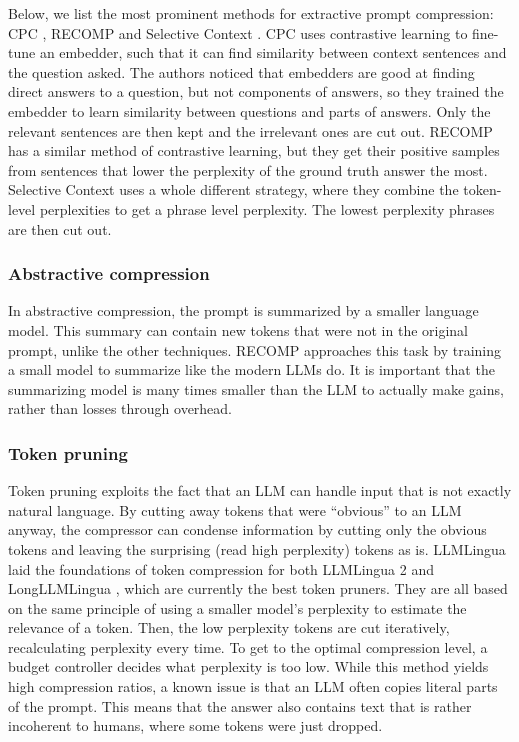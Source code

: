 Below, we list the most prominent methods for extractive prompt compression: CPC \cite{liskavets2025cpc}, RECOMP \cite{xu2023recomp} and Selective Context \cite{li2023selectivecontext}. CPC uses contrastive learning to fine-tune an embedder, such that it can find similarity between context sentences and the question asked. The authors noticed that embedders are good at finding direct answers to a question, but not components of answers, so they trained the embedder to learn similarity between questions and parts of answers. Only the relevant sentences are then kept and the irrelevant ones are cut out. RECOMP has a similar method of contrastive learning, but they get their positive samples from sentences that lower the perplexity of the ground truth answer the most. Selective Context uses a whole different strategy, where they combine the token-level perplexities to get a phrase level perplexity. The lowest perplexity phrases are then cut out.

\subsubsection{Abstractive compression}
In abstractive compression, the prompt is summarized by a smaller language model. This summary can contain new tokens that were not in the original prompt, unlike the other techniques. RECOMP \cite{xu2023recomp} approaches this task by training a small model to summarize like the modern LLMs do. It is important that the summarizing model is many times smaller than the LLM to actually make gains, rather than losses through overhead.

\subsubsection{Token pruning}
Token pruning exploits the fact that an LLM can handle input that is not exactly natural language. By cutting away tokens that were ``obvious'' to an LLM anyway, the compressor can condense information by cutting only the obvious tokens and leaving the surprising (read high perplexity) tokens as is. LLMLingua \cite{jiang2023llmlingua} laid the foundations of token compression for both LLMLingua 2 \cite{pan2024llmlingua2} and LongLLMLingua \cite{jiang2023longllmlingua}, which are currently the best token pruners. They are all based on the same principle of using a smaller model's perplexity to estimate the relevance of a token. Then, the low perplexity tokens are cut iteratively, recalculating perplexity every time. To get to the optimal compression level, a budget controller decides what perplexity is too low. While this method yields high compression ratios, a known issue is that an LLM often copies literal parts of the prompt. This means that the answer also contains text that is rather incoherent to humans, where some tokens were just dropped.

